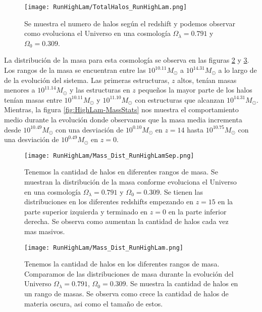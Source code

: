 \begin{figure}[H]
    \centering
    \texttt{[image: RunHighLam/TotalHalos\_RunHighLam.png]}
    \caption[Evolución del número de halos en un Universo $\Omega_\lambda = 0.791$, $\Omega_0 = 0.309$]{\footnotesize Se muestra el numero de halos según el redshift y podemos observar como evoluciona el Universo en una cosmología $\Omega_\lambda = 0.791$ y $\Omega_0 = 0.309$.}
    \label{fig:HighLam_TotalHalos}
\end{figure}

La distribución de la masa para esta cosmología se observa en las figuras \ref{fig:HighLam-MassDistSep} y \ref{fig:HighLam-MassDist}. Los rangos de la masa se encuentran entre las $10^{10.11}M_\odot$ a $10^{14.31}M_\odot$ a lo largo de de la evolución del sistema. Las primeras estructuras, $z$ altos, tenían masas menores a $10^{11.14}M_\odot$ y las estructuras en $z$ pequeños la mayor parte de los halos tenían masas entre $10^{10.11}M_\odot$ y $10^{11.10}M_\odot$ con estructuras que alcanzan $10^{14.31}M_\odot$. Mientras, la figura \ref{fig:HighLam-MassStats} nos muestra el comportamiento medio durante la evolución donde observamos que la masa media incrementa desde $10^{10.49}M_\odot$ con una desviación de $10^{0.10}M_\odot$ en $z=14$ hasta $10^{10.75}M_\odot$ con una desviación de $10^{0.49}M_\odot$ en $z=0$.

\begin{figure}[H]
    \centering
    \texttt{[image: RunHighLam/Mass\_Dist\_RunHighLamSep.png]}
    \caption[Distribución de masa]{\footnotesize Tenemos la cantidad de halos en diferentes rangos de masa. Se muestran la distribución de la masa conforme evoluciona el Universo en una cosmología $\Omega_\lambda = 0.791$ y $\Omega_0 = 0.309$. Se tienen las distribuciones en los diferentes redshifts empezando en $z=15$ en la parte superior izquierda y terminado en $z=0$ en la parte inferior derecha. Se observa como aumentan la cantidad de halos cada vez mas masivos.}
    \label{fig:HighLam-MassDistSep}
\end{figure}

\begin{figure}[H]
    \centering
    \texttt{[image: RunHighLam/Mass\_Dist\_RunHighLam.png]}
    \caption[Comparación de distribución de masa]{\footnotesize Tenemos la cantidad de halos en los diferentes rangos de masa. Comparamos de las distribuciones de masa durante la evolución del Universo $\Omega_\lambda = 0.791$, $\Omega_0 = 0.309$. Se muestra la cantidad de halos en un rango de masas. Se observa como crece la cantidad de halos de materia oscura, asi como el tamaño de estos.}
    \label{fig:HighLam-MassDist}
\end{figure}

